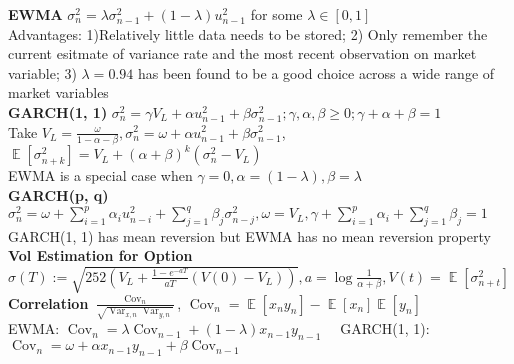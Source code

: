 \documentclass[12pt,landscape, a4paper]{article}
\theoremstyle{remark}
\newcommand{\var}{\operatorname{Var}}
\newcommand{\E}{\operatorname{\mathbb{E}}}
\newcommand{\cov}{\operatorname{Cov}}
\begin{document}
\begin{multicols*}{3}
\textbf{EWMA} $\sigma^2_n = \lambda \sigma^2_{n-1} + (1-\lambda) u^2_{n-1}$ for some $\lambda \in [0, 1]$\\
Advantages: 1)Relatively little data needs to be stored; 2) Only remember the current esitmate of variance rate and the most recent observation on market variable; 3) $\lambda=0.94$ has been found to be a good choice across a wide range of market variables\\
\textbf{GARCH(1, 1)} $\sigma^2_n = \gamma V_L + \alpha u_{n-1}^2 + \beta \sigma^2_{n-1}; \gamma, \alpha, \beta\geq 0; \gamma+ \alpha+ \beta=1$\\
Take $V_L = \frac{\omega}{1-\alpha-\beta}, \sigma^2_n = \omega + \alpha u^2_{n-1} + \beta \sigma^2_{n-1}$, $\E [\sigma^2_{n+k}] =V_L + (\alpha+\beta)^k (\sigma^2_n - V_L) $\\
EWMA is a special case when $\gamma=0, \alpha = (1-\lambda), \beta=\lambda$\\
\textbf{GARCH(p, q) } $\sigma^2_n = \omega+ \sum^p_{i=1} \alpha_i u^2_{n-i} +\sum^q_{j=1} \beta_j \sigma^2_{n-j}, \omega=V_L , \gamma + \sum^p_{i=1} \alpha_i + \sum^q_{j=1} \beta_j = 1$\\

GARCH(1, 1) has mean reversion but EWMA has no mean reversion property\\
\textbf{Vol Estimation for Option} $\sigma (T) :=\sqrt{252\left(V_L + \frac{1-e^{-aT}}{aT}( V(0) -V_L ) \right)}, a = \log \frac{1}{\alpha + \beta}, V(t) = \E [\sigma^2_{n+t}] $
\\
\textbf{Correlation} $\frac{\cov_n}{\sqrt{\var_{x, n} \var_{y, n}}}$, $\cov_n = \E [x_n y_n] - \E [x_n] \E [y_n]$\\
EWMA: $\cov_n = \lambda \cov_{n-1} + (1-\lambda) x_{n-1} y_{n-1}\quad$
GARCH(1, 1): $\cov_n = \omega + \alpha x_{n-1} y_{n-1} +\beta \cov_{n-1}$\\


\end{multicols*}
\end{document}

